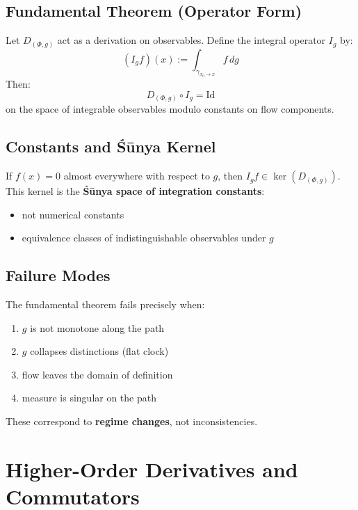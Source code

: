 \documentclass[12pt, oneside]{article}
\begin{document}
\subsection{Fundamental Theorem (Operator Form)}

Let $D_{(\Phi,g)}$ act as a derivation on observables. Define the integral operator $I_g$ by:
\begin{equation}
(I_g f)(x) := \int_{\gamma_{x_0 \to x}} f \, dg
\end{equation}
Then:
\begin{equation}
D_{(\Phi,g)} \circ I_g = \text{Id}
\end{equation}
on the space of integrable observables modulo constants on flow components.

\subsection{Constants and Śūnya Kernel}

If $f(x) = 0$ almost everywhere with respect to $g$, then $I_g f \in \ker(D_{(\Phi,g)})$. This kernel is the \textbf{Śūnya space of integration constants}:
\begin{itemize}
    \item not numerical constants
    \item equivalence classes of indistinguishable observables under $g$
\end{itemize}

\subsection{Failure Modes}

The fundamental theorem fails precisely when:
\begin{enumerate}
    \item $g$ is not monotone along the path
    \item $g$ collapses distinctions (flat clock)
    \item flow leaves the domain of definition
    \item measure is singular on the path
\end{enumerate}
These correspond to \textbf{regime changes}, not inconsistencies.

\section{Higher-Order Derivatives and Commutators}
\end{document}
